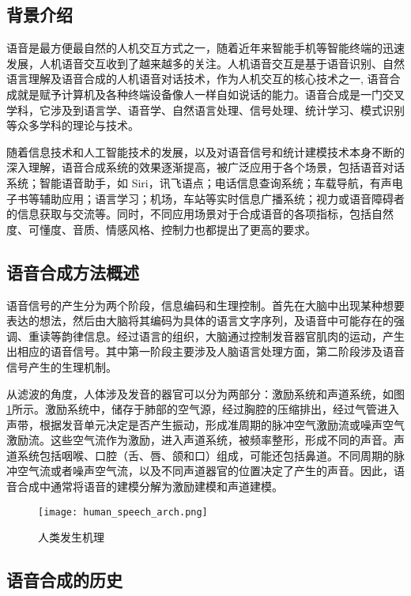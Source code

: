 \documentclass[cn,10pt,math=newtx,citestyle=gb7714-2015,bibstyle=gb7714-2015]{elegantbook}
\begin{document}
\subsection{背景介绍}

语音是最方便最自然的人机交互方式之一，随着近年来智能手机等智能终端的迅速发展，人机语音交互收到了越来越多的关注。人机语音交互是基于语音识别、自然语言理解及语音合成的人机语音对话技术，作为人机交互的核心技术之一, 语音合成就是赋予计算机及各种终端设备像人一样自如说话的能力。语音合成是一门交叉学科，它涉及到语言学、语音学、自然语言处理、信号处理、统计学习、模式识别等众多学科的理论与技术。

随着信息技术和人工智能技术的发展，以及对语音信号和统计建模技术本身不断的深入理解，语音合成系统的效果逐渐提高，被广泛应用于各个场景，包括语音对话系统；智能语音助手，如 Siri，讯飞语点；电话信息查询系统；车载导航，有声电子书等辅助应用；语言学习；机场，车站等实时信息广播系统；视力或语音障碍者的信息获取与交流等。同时，不同应用场景对于合成语音的各项指标，包括自然度、可懂度、音质、情感风格、控制力也都提出了更高的要求。

\subsection{语音合成方法概述}

  语音信号的产生分为两个阶段，信息编码和生理控制。首先在大脑中出现某种想要表达的想法，然后由大脑将其编码为具体的语言文字序列，及语音中可能存在的强调、重读等韵律信息。经过语言的组织，大脑通过控制发音器官肌肉的运动，产生出相应的语音信号。其中第一阶段主要涉及人脑语言处理方面，第二阶段涉及语音信号产生的生理机制。

  从滤波的角度，人体涉及发音的器官可以分为两部分：激励系统和声道系统，如图\ref{fig:human_speech_arch}所示。激励系统中，储存于肺部的空气源，经过胸腔的压缩排出，经过气管进入声带，根据发音单元决定是否产生振动，形成准周期的脉冲空气激励流或噪声空气激励流。这些空气流作为激励，进入声道系统，被频率整形，形成不同的声音。声道系统包括咽喉、口腔（舌、唇、颌和口）组成，可能还包括鼻道。不同周期的脉冲空气流或者噪声空气流，以及不同声道器官的位置决定了产生的声音。因此，语音合成中通常将语音的建模分解为激励建模和声道建模。

  \begin{figure}[htbp]
    \centering
    \texttt{[image: human\_speech\_arch.png]}
    \caption{人类发生机理 \label{fig:human_speech_arch}}
  \end{figure}

\subsection{语音合成的历史}
  
\end{document}
